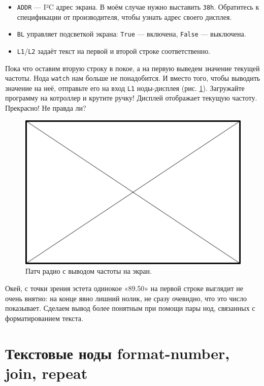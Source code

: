 \begin{itemize}
  \item \texttt{ADDR} — I²C адрес экрана. В моём случае нужно выставить \texttt{38h}. Обратитесь к спецификации от производителя, чтобы узнать адрес своего дисплея.
  \item \texttt{BL} управляет подсветкой экрана: \texttt{True} — включена, \texttt{False} — выключена.
  \item \texttt{L1}/\texttt{L2} задаёт текст на первой и второй строке соответственно.
\end{itemize}

Пока что оставим вторую строку в покое, а на первую выведем значение текущей частоты. Нода \texttt{watch} нам больше не понадобится. И вместо того, чтобы выводить значение на неё, отправьте его на вход \texttt{L1} ноды-дисплея (рис. \ref{patch:lcd-freq}). Загружайте программу на котроллер и крутите ручку! Дисплей отображает текущую частоту. Прекрасно! Не правда ли?

\begin{figure}
  \centering
  \includegraphics{TODO}
  \caption{Патч радио с выводом частоты на экран.}
  \label{patch:lcd-freq}
\end{figure}

Окей, с точки зрения эстета одинокое «89.50» на первой строке выглядит не очень внятно: на конце явно лишний нолик, не сразу очевидно, что это число показывает. Сделаем вывод более понятным при помощи пары нод, связанных с форматированием текста.

\section{Текстовые ноды format-number, join, repeat}

